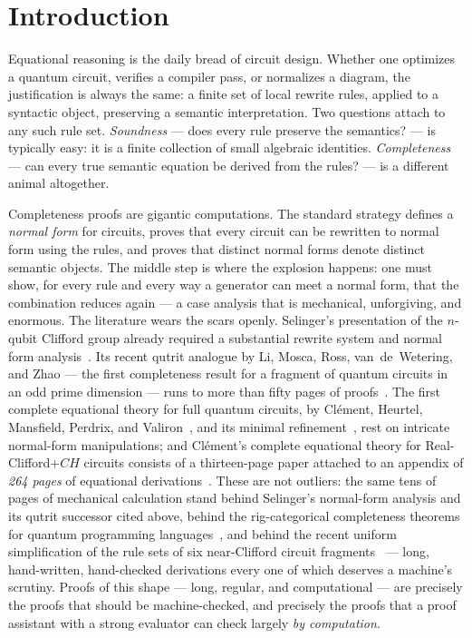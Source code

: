 \section{Introduction}\label{sec:intro}

Equational reasoning is the daily bread of circuit design.  Whether one
optimizes a quantum circuit, verifies a compiler pass, or normalizes a
diagram, the justification is always the same: a finite set of local rewrite
rules, applied to a syntactic object, preserving a semantic interpretation.
Two questions attach to any such rule set.  \emph{Soundness} --- does every
rule preserve the semantics? --- is typically easy: it is a finite collection
of small algebraic identities.  \emph{Completeness} --- can every true
semantic equation be derived from the rules? --- is a different animal
altogether.

Completeness proofs are gigantic computations.  The standard strategy defines
a \emph{normal form} for circuits, proves that every circuit can be rewritten
to normal form using the rules, and proves that distinct normal forms denote
distinct semantic objects.  The middle step is where the explosion happens:
one must show, for every rule and every way a generator can meet a normal
form, that the combination reduces again --- a case analysis that is
mechanical, unforgiving, and enormous.  The literature wears the scars
openly.  Selinger's presentation of the $n$-qubit Clifford group already
required a substantial rewrite system and normal form
analysis~\cite{selinger2015clifford}.  Its recent qutrit
analogue by Li, Mosca, Ross, van~de~Wetering, and Zhao --- the first
completeness result for a fragment of quantum circuits in an odd prime
dimension --- runs to more than fifty pages of
proofs~\cite{li2025qutrit}.  The first complete equational theory for full
quantum circuits, by Cl\'ement, Heurtel, Mansfield, Perdrix, and
Valiron~\cite{clement2023complete}, and its minimal
refinement~\cite{clement2024minimal}, rest on intricate normal-form
manipulations; and Cl\'ement's complete equational theory for
Real-Clifford+$CH$ circuits consists of a thirteen-page paper attached to an
appendix of \emph{264 pages} of equational
derivations~\cite{clement2026realcliffordch}.  These are not outliers: the
same tens of pages of mechanical calculation stand behind Selinger's
normal-form analysis and its qutrit successor cited above, behind the
rig-categorical completeness theorems for quantum programming
languages~\cite{carette2024squareroots,fang2026hadamard}, and behind the
recent uniform simplification of the rule sets of six near-Clifford circuit
fragments~\cite{blake2026simpler} --- long, hand-written, hand-checked
derivations every one of which deserves a machine's scrutiny.  Proofs of
this shape --- long, regular, and computational --- are precisely the proofs
that should be machine-checked, and precisely the proofs that a proof assistant with a
strong evaluator can check largely \emph{by computation}.

